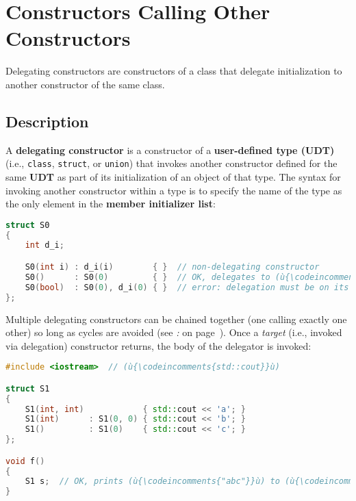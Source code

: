 \newpage
\section[Delegating Ctors]{Constructors Calling Other Constructors}\label{delegating-constructors}


Delegating constructors are constructors of a class that delegate initialization to another
constructor of the same class.

\subsection[Description]{Description}\label{description}

A \textbf{delegating constructor} is a constructor of a
\textbf{user-defined type (UDT)} (i.e., \texttt{class}, \texttt{struct}, or
\texttt{union}) that invokes another constructor defined for the same
\textbf{UDT} as part of its initialization of an object of that type.
The syntax for invoking another constructor within a type is to specify
the name of the type as the only element in the \textbf{member
initializer list}:

\begin{lstlisting}[language=C++]
struct S0
{
    int d_i;

    S0(int i) : d_i(i)        { }  // non-delegating constructor
    S0()      : S0(0)         { }  // OK, delegates to (ù{\codeincomments{S0(int)}}ù)
    S0(bool)  : S0(0), d_i(0) { }  // error: delegation must be on its own
};
\end{lstlisting}

\noindent Multiple delegating constructors can be chained together (one calling
exactly one other) so long as cycles are avoided (see
{\it{}:} {\it{}} on page~\pageref{delegation-cycles}). Once a \emph{target} (i.e., invoked via delegation) constructor returns,
the body of the delegator is invoked:

\begin{lstlisting}[language=C++]
#include <iostream>  // (ù{\codeincomments{std::cout}}ù)

struct S1
{
    S1(int, int)            { std::cout << 'a'; }
    S1(int)      : S1(0, 0) { std::cout << 'b'; }
    S1()         : S1(0)    { std::cout << 'c'; }
};

void f()
{
    S1 s;  // OK, prints (ù{\codeincomments{"abc"}}ù) to (ù{\codeincomments{stdout}}ù)
}
\end{lstlisting}

